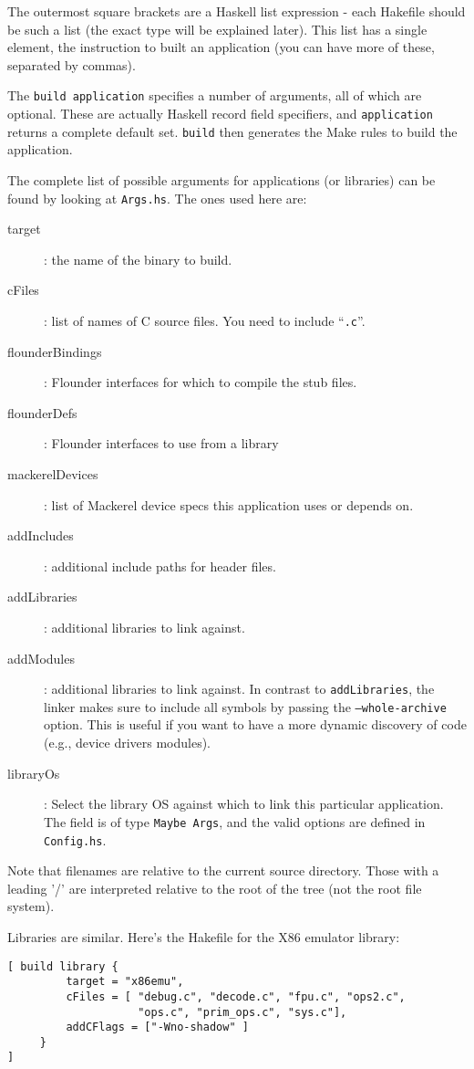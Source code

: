 \documentclass[a4paper,twoside]{report} %
\begin{document}
The outermost square brackets are a Haskell list expression - each
Hakefile should be such a list (the exact type will be explained
later).   This list has a single element, the instruction to built an
application (you can have more of these, separated by commas).

The \texttt{build application} specifies a number of arguments, all of
which are optional.  These are actually Haskell record field
specifiers, and \texttt{application} returns a complete default set.
\texttt{build} then generates the Make rules to build the
application.

The complete list of possible arguments for applications (or
libraries) can be found by looking at \texttt{Args.hs}.  The ones used
here are:
\begin{description}
\item[target]: the name of the binary to build.
\item[cFiles]: list of names of C source files. You need to include
  ``\texttt{.c}''.
\item[flounderBindings]: Flounder interfaces for which to compile
  the stub files.
\item[flounderDefs]: Flounder interfaces to use from a library
\item[mackerelDevices]: list of Mackerel device specs this application uses or depends on.
\item[addIncludes]: additional include paths for header files.
\item[addLibraries]: additional libraries to link against.
\item[addModules]: additional libraries to link against. In contrast to
\texttt{addLibraries}, the linker makes sure to include all symbols by passing
the \texttt{--whole-archive} option. This is useful if you want to have a more
dynamic discovery of code (e.g., device drivers modules).
\item[libraryOs]: Select the library OS against which to link this particular
  application. The field is of type \verb|Maybe Args|, and the valid options are
  defined in \verb|Config.hs|.
\end{description}

Note that filenames are relative to the current source
directory. Those with a leading '/' are interpreted relative to the
root of the tree (not the root file system).

Libraries are similar.  Here's the Hakefile for the X86 emulator
library:
\begin{verbatim}
[ build library {
         target = "x86emu",
         cFiles = [ "debug.c", "decode.c", "fpu.c", "ops2.c",
                    "ops.c", "prim_ops.c", "sys.c"],
         addCFlags = ["-Wno-shadow" ]
     }
]
\end{verbatim}
\end{document}
